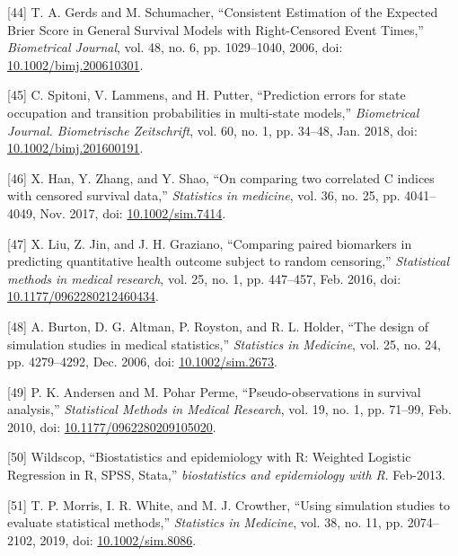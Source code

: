 \documentclass[12pt,PhD,twoside,openright]{muthesis}
\newenvironment{cslreferences}%
  {}%
  {\par}
\begin{document}
\begin{cslreferences}
\leavevmode\hypertarget{ref-gerds_consistent_2006}{}%
{[}44{]} T. A. Gerds and M. Schumacher, ``Consistent Estimation of the Expected Brier Score in General Survival Models with Right-Censored Event Times,'' \emph{Biometrical Journal}, vol. 48, no. 6, pp. 1029--1040, 2006, doi: \href{https://doi.org/10.1002/bimj.200610301}{10.1002/bimj.200610301}.

\leavevmode\hypertarget{ref-spitoni_prediction_2018}{}%
{[}45{]} C. Spitoni, V. Lammens, and H. Putter, ``Prediction errors for state occupation and transition probabilities in multi-state models,'' \emph{Biometrical Journal. Biometrische Zeitschrift}, vol. 60, no. 1, pp. 34--48, Jan. 2018, doi: \href{https://doi.org/10.1002/bimj.201600191}{10.1002/bimj.201600191}.

\leavevmode\hypertarget{ref-han_comparing_2017}{}%
{[}46{]} X. Han, Y. Zhang, and Y. Shao, ``On comparing two correlated C indices with censored survival data,'' \emph{Statistics in medicine}, vol. 36, no. 25, pp. 4041--4049, Nov. 2017, doi: \href{https://doi.org/10.1002/sim.7414}{10.1002/sim.7414}.

\leavevmode\hypertarget{ref-liu_comparing_2016}{}%
{[}47{]} X. Liu, Z. Jin, and J. H. Graziano, ``Comparing paired biomarkers in predicting quantitative health outcome subject to random censoring,'' \emph{Statistical methods in medical research}, vol. 25, no. 1, pp. 447--457, Feb. 2016, doi: \href{https://doi.org/10.1177/0962280212460434}{10.1177/0962280212460434}.

\leavevmode\hypertarget{ref-burton_design_2006}{}%
{[}48{]} A. Burton, D. G. Altman, P. Royston, and R. L. Holder, ``The design of simulation studies in medical statistics,'' \emph{Statistics in Medicine}, vol. 25, no. 24, pp. 4279--4292, Dec. 2006, doi: \href{https://doi.org/10.1002/sim.2673}{10.1002/sim.2673}.

\leavevmode\hypertarget{ref-andersen_pseudo-observations_2010}{}%
{[}49{]} P. K. Andersen and M. Pohar Perme, ``Pseudo-observations in survival analysis,'' \emph{Statistical Methods in Medical Research}, vol. 19, no. 1, pp. 71--99, Feb. 2010, doi: \href{https://doi.org/10.1177/0962280209105020}{10.1177/0962280209105020}.

\leavevmode\hypertarget{ref-wildscop_biostatistics_2013}{}%
{[}50{]} Wildscop, ``Biostatistics and epidemiology with R: Weighted Logistic Regression in R, SPSS, Stata,'' \emph{biostatistics and epidemiology with R}. Feb-2013.

\leavevmode\hypertarget{ref-morris_using_2019}{}%
{[}51{]} T. P. Morris, I. R. White, and M. J. Crowther, ``Using simulation studies to evaluate statistical methods,'' \emph{Statistics in Medicine}, vol. 38, no. 11, pp. 2074--2102, 2019, doi: \href{https://doi.org/10.1002/sim.8086}{10.1002/sim.8086}.


\end{cslreferences}
\end{document}
